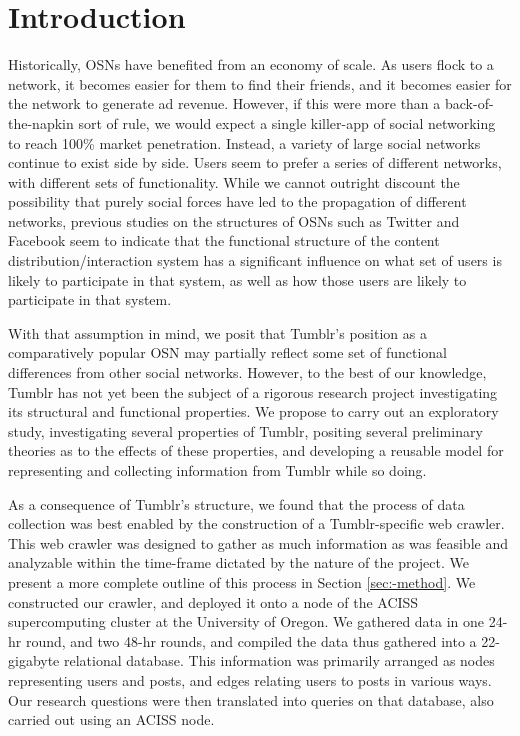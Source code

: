 \section{Introduction}
\label{sec:-intro}


Historically, OSNs have benefited from an economy of scale.  As users 
flock to a network, it becomes easier for them to find their friends, 
and it becomes easier for the network to generate ad revenue.  However, 
if this were more than a back-of-the-napkin sort of rule, we would 
expect a single killer-app of social networking to reach 100\% market 
penetration.  Instead, a variety of large social networks continue 
to exist side by side.  Users seem to prefer a series of different 
networks, with different sets of functionality.  While we cannot 
outright discount the possibility that purely social forces have led to the 
propagation of different networks, previous studies on the structures 
of OSNs such as Twitter\cite{kwak2010twitter} and Facebook\cite{viswanath2009evolution}
seem to indicate that the functional structure of the content 
distribution/interaction system has a significant influence on what set of 
users is likely to participate in that system, as well as how those users 
are likely to participate in that system.


With that assumption in mind, we posit that Tumblr's position as a 
comparatively popular OSN may partially reflect some 
set of functional differences from other social networks.  However, to 
the best of our knowledge, Tumblr has not yet been the subject of 
a rigorous research project investigating its structural 
and functional properties.  We propose to carry out an exploratory study, 
investigating several properties of Tumblr, positing several preliminary 
theories as to the effects of these properties, and developing a reusable 
model for representing and collecting information from Tumblr while so 
doing.

As a consequence of Tumblr's structure, we found that the process of 
data collection was best enabled by the construction of a 
Tumblr-specific web crawler.  This web crawler was designed to gather 
as much information as was feasible and analyzable within the time-frame 
dictated by the nature of the project.  We present a more complete 
outline of this process in Section \ref{sec:-method}.  We constructed 
our crawler, and deployed it onto a node of the ACISS supercomputing 
cluster at the University of Oregon.  We gathered data in one 24-hr 
round, and two 48-hr rounds, and compiled the data thus gathered into a 
22-gigabyte relational database.  This information was primarily arranged 
as nodes representing users and posts, and edges relating users to 
posts in various ways. Our research questions were then translated into 
queries on that database, also carried out using an ACISS node.

